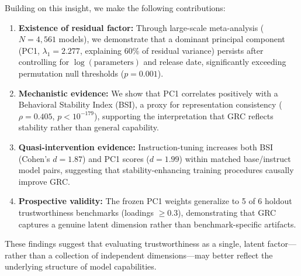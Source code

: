 Building on this insight, we make the following contributions:

\begin{enumerate}
    \item \textbf{Existence of residual factor:} Through large-scale meta-analysis ($N = 4{,}561$ models), we demonstrate that a dominant principal component (PC1, $\lambda_1 = 2.277$, explaining 60\% of residual variance) persists after controlling for $\log(\text{parameters})$ and release date, significantly exceeding permutation null thresholds ($p = 0.001$).

    \item \textbf{Mechanistic evidence:} We show that PC1 correlates positively with a Behavioral Stability Index (BSI), a proxy for representation consistency ($\rho = 0.405$, $p < 10^{-179}$), supporting the interpretation that GRC reflects stability rather than general capability.

    \item \textbf{Quasi-intervention evidence:} Instruction-tuning increases both BSI (Cohen's $d = 1.87$) and PC1 scores ($d = 1.99$) within matched base/instruct model pairs, suggesting that stability-enhancing training procedures causally improve GRC.

    \item \textbf{Prospective validity:} The frozen PC1 weights generalize to 5 of 6 holdout trustworthiness benchmarks (loadings $\geq 0.3$), demonstrating that GRC captures a genuine latent dimension rather than benchmark-specific artifacts.
\end{enumerate}

These findings suggest that evaluating trustworthiness as a single, latent factor---rather than a collection of independent dimensions---may better reflect the underlying structure of model capabilities.
